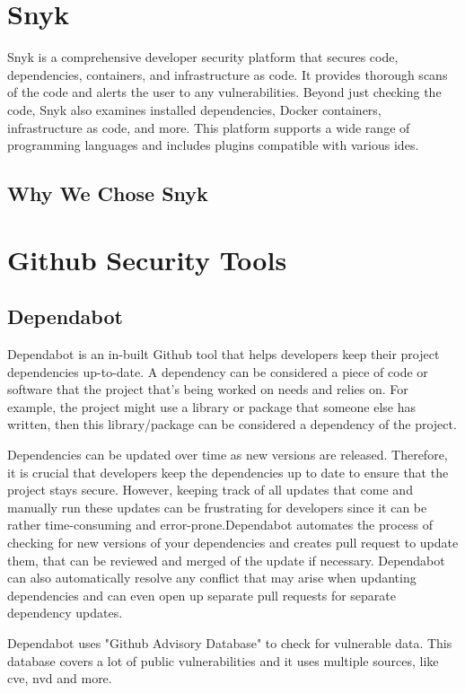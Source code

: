 \section{Snyk}
Snyk is a comprehensive developer security platform that secures code, dependencies, containers, and infrastructure as code. It provides thorough scans of the code and alerts the user to any vulnerabilities. Beyond just checking the code, Snyk also examines installed dependencies, Docker containers, infrastructure as code, and more. This platform supports a wide range of programming languages and includes plugins compatible with various \acrlong{ide}s.\cite{snyk}
\subsection{Why We Chose Snyk}

\section{Github Security Tools}

\subsection{Dependabot}
Dependabot is an in-built Github tool that helps developers keep their project dependencies up-to-date. A dependency can be considered a piece of code or software that the project that's being worked on needs and relies on. For example, the project might use a library or package that someone else has written, then this library/package can be considered a dependency of the project. 

Dependencies can be updated over time as new versions are released. Therefore, it is crucial that developers keep the dependencies up to date to ensure that the project stays secure. However, keeping track of all updates that come and manually run these updates can be frustrating for developers since it can be rather time-consuming and error-prone.Dependabot automates the process of checking for new versions of your dependencies and creates pull request to update them, that can be reviewed and merged of the update if necessary. 
Dependabot can also automatically resolve any conflict that may arise when updanting dependencies and can even open up separate pull requests for separate dependency updates.  \cite{GithubDependabot2}

Dependabot uses "Github Advisory Database" to check for vulnerable data. This database covers a lot of public vulnerabilities and it uses multiple sources, like \acrlong{cve}, \acrlong{nvd} and more. \cite{GithubDependabot1}


